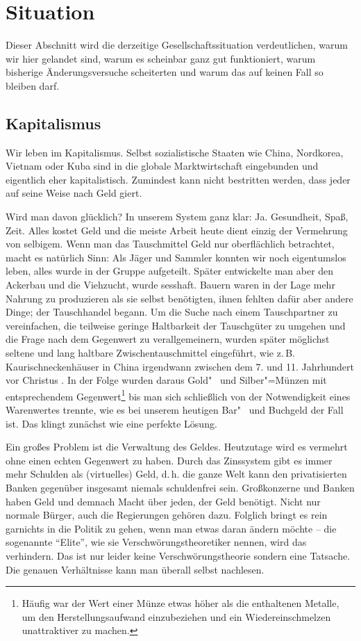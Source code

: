 \section{Situation}\label{sec:situation}

Dieser Abschnitt wird die derzeitige Gesellschaftssituation verdeutlichen, warum wir hier gelandet sind, warum es scheinbar ganz gut funktioniert, warum bisherige Änderungsversuche scheiterten und warum das auf keinen Fall so bleiben darf.

\subsection{Kapitalismus}\label{sec:situation/capitalism}

Wir leben im Kapitalismus. Selbst sozialistische Staaten wie China, Nordkorea, Vietnam oder Kuba sind in die globale Marktwirtschaft eingebunden und eigentlich eher kapitalistisch. Zumindest kann nicht bestritten werden, dass jeder auf seine Weise nach Geld giert.

Wird man davon glücklich? In unserem System ganz klar: Ja. Gesundheit, Spaß, Zeit. Alles kostet Geld und die meiste Arbeit heute dient einzig der Vermehrung von selbigem. Wenn man das Tauschmittel Geld nur oberflächlich betrachtet, macht es natürlich Sinn: Als Jäger und Sammler konnten wir noch eigentumslos leben, alles wurde in der Gruppe aufgeteilt. Später entwickelte man aber den Ackerbau und die Viehzucht, wurde sesshaft. Bauern waren in der Lage mehr Nahrung zu produzieren als sie selbst benötigten, ihnen fehlten dafür aber andere Dinge; der Tauschhandel begann. Um die Suche nach einem Tauschpartner zu vereinfachen, die teilweise geringe Haltbarkeit der Tauschgüter zu umgehen und die Frage nach dem Gegenwert zu verallgemeinern, wurden später möglichst seltene und lang haltbare Zwischentauschmittel eingeführt, wie z.\,B. Kaurischneckenhäuser in China irgendwann zwischen dem 7. und 11. Jahrhundert vor Christus \citep{yungti_2003}. In der Folge wurden daraus Gold"~ und Silber"=Münzen mit entsprechendem Gegenwert\footnote{Häufig war der Wert einer Münze etwas höher als die enthaltenen Metalle, um den Herstellungsaufwand einzubeziehen und ein Wiedereinschmelzen unattraktiver zu machen.} bis man sich schließlich von der Notwendigkeit eines Warenwertes trennte, wie es bei unserem heutigen Bar"~ und Buchgeld der Fall ist. Das klingt zunächst wie eine perfekte Lösung.

Ein großes Problem ist die Verwaltung des Geldes. Heutzutage wird es vermehrt ohne einen echten Gegenwert zu haben. Durch das Zinssystem gibt es immer mehr Schulden als (virtuelles) Geld, d.\,h. die ganze Welt kann den privatisierten Banken gegenüber insgesamt niemals schuldenfrei sein. Großkonzerne und Banken haben Geld und demnach Macht über jeden, der Geld benötigt. Nicht nur normale Bürger, auch die Regierungen gehören dazu. Folglich bringt es rein garnichts in die Politik zu gehen, wenn man etwas daran ändern möchte -- die sogenannte "`Elite"', wie sie Verschwörungstheoretiker nennen, wird das verhindern. Das ist nur leider keine Verschwörungstheorie sondern eine Tatsache. Die genauen Verhältnisse kann man überall selbst nachlesen.

